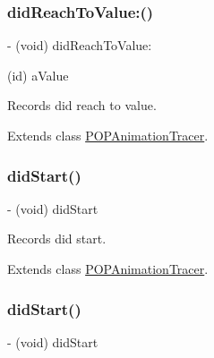 \subsubsection{\texorpdfstring{did\+Reach\+To\+Value\+:()}{didReachToValue:()}\hspace{0.1cm}{\footnotesize\ttfamily [2/2]}}
{\footnotesize\ttfamily -\/ (void) did\+Reach\+To\+Value\+: \begin{DoxyParamCaption}\item[{(id)}]{a\+Value }\end{DoxyParamCaption}}

Records did reach to value. 

Extends class \mbox{\hyperlink{interface_p_o_p_animation_tracer_a03287c5af7d17de6143c7dcc0ac56251}{P\+O\+P\+Animation\+Tracer}}.

\mbox{\label{category_p_o_p_animation_tracer_07_internal_08_a91b472c0e05c912fe9d05e2e9de17f9f}} 
\subsubsection{\texorpdfstring{did\+Start()}{didStart()}\hspace{0.1cm}{\footnotesize\ttfamily [1/2]}}
{\footnotesize\ttfamily -\/ (void) did\+Start \begin{DoxyParamCaption}{ }\end{DoxyParamCaption}}

Records did start. 

Extends class \mbox{\hyperlink{interface_p_o_p_animation_tracer_a91b472c0e05c912fe9d05e2e9de17f9f}{P\+O\+P\+Animation\+Tracer}}.

\mbox{\label{category_p_o_p_animation_tracer_07_internal_08_a91b472c0e05c912fe9d05e2e9de17f9f}} 
\subsubsection{\texorpdfstring{did\+Start()}{didStart()}\hspace{0.1cm}{\footnotesize\ttfamily [2/2]}}
{\footnotesize\ttfamily -\/ (void) did\+Start \begin{DoxyParamCaption}{ }\end{DoxyParamCaption}}

